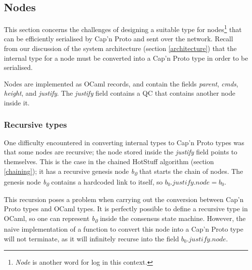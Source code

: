 \subsection{Nodes}
This section concerns the challenges of designing a suitable type for nodes\footnote{\textit{Node} is another word for log in this context.} that can be efficiently serialised by Cap'n Proto and sent over the network. Recall from our discussion of the system architecture (section \ref{architecture}) that the internal type for a node must be converted into a Cap'n Proto type in order to be serialised.

Nodes are implemented as OCaml records, and contain the fields \textit{parent}, \textit{cmds}, \textit{height}, and \textit{justify}. The \textit{justify} field contains a QC that contains another node inside it.

\subsubsection{Recursive types}
One difficulty encountered in converting internal types to Cap'n Proto types was that some nodes are recursive; the node stored inside the \textit{justify} field points to themselves. This is the case in the chained HotStuff algorithm (section \ref{chaining}); it has a recursive genesis node \textit{b\textsubscript{0}} that starts the chain of nodes. The genesis node \textit{b\textsubscript{0}} contains a hardcoded link to itself, so $ b_0.\textit{justify}.\textit{node} = b_0$.

This recursion poses a problem when carrying out the conversion between Cap'n Proto types and OCaml types. It is perfectly possible to define a recursive type in OCaml, so one can represent \textit{b\textsubscript{0}} inside the consensus state machine. However, the naive implementation of a function to convert this node into a Cap'n Proto type will not terminate, as it will infinitely recurse into the field $ b_0.\textit{justify}.\textit{node} $.

